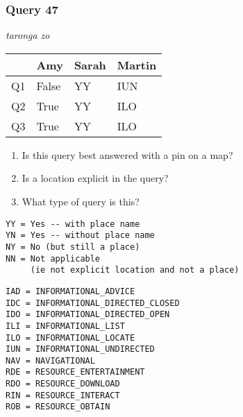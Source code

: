 \begin{frame}[fragile]
\frametitle{Query 47}
\vspace{1em}

\emph{taronga zo}

\vfill

\begin{table}
  \centering
  \begin{tabular}{ l l l l }
    & \textbf{Amy} & \textbf{Sarah} & \textbf{Martin}\\
    \toprule
    Q1 & False & YY & IUN\\
Q2 & True & YY & ILO\\
Q3 & True & YY & ILO\\
    \bottomrule
  \end{tabular}
\end{table}

\vfill

\tiny{

\begin{enumerate}
\item Is this query best answered with a pin on a map?
\item Is a location explicit in the query?
\item What type of query is this?
\end{enumerate}

\vfill

\begin{multicols}{2}
\begin{verbatim}
YY = Yes -- with place name
YN = Yes -- without place name
NY = No (but still a place)
NN = Not applicable 
     (ie not explicit location and not a place)
\end{verbatim}

\columnbreak
\begin{verbatim}
IAD = INFORMATIONAL_ADVICE
IDC = INFORMATIONAL_DIRECTED_CLOSED
IDO = INFORMATIONAL_DIRECTED_OPEN
ILI = INFORMATIONAL_LIST
ILO = INFORMATIONAL_LOCATE
IUN = INFORMATIONAL_UNDIRECTED
NAV = NAVIGATIONAL
RDE = RESOURCE_ENTERTAINMENT
RDO = RESOURCE_DOWNLOAD
RIN = RESOURCE_INTERACT
ROB = RESOURCE_OBTAIN
\end{verbatim}
\end{multicols}
}

\end{frame}



